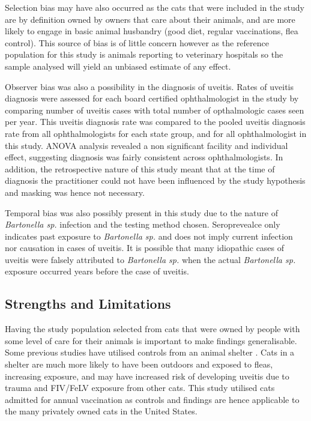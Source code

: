 \documentclass[11pt,twocolumn]{article}
\begin{document}
		Selection bias may have also occurred as the cats that were included in the study are by definition owned by owners that care about their animals, and are more likely to engage in basic animal husbandry (good diet, regular vaccinations, flea control).
		This source of bias is of little concern however as the reference population for this study is animals reporting to veterinary hospitals so the sample analysed will yield an unbiased estimate of any effect.


		Observer bias was also a possibility in the diagnosis of uveitis.
		Rates of uveitis diagnosis were assessed for each board certified ophthalmologist in the study by comparing number of uveitis cases with total number of opthalmologic cases seen per year. This uveitis diagnosis rate was compared to the pooled uveitis diagnosis rate from all ophthalmologists for each state group, and for all ophthalmologist in this study.
		ANOVA analysis revealed a non significant facility and individual effect, suggesting diagnosis was fairly consistent across ophthalmologists.
		In addition, the retrospective nature of this study meant that at the time of diagnosis the practitioner could not have been influenced by the study hypothesis and masking was hence not necessary. 


		Temporal bias was also possibly present in this study due to the nature of \emph{Bartonella sp.} infection and the testing method chosen. 
		Seroprevealce only indicates past exposure to \emph{Bartonella sp.} and does not imply current infection nor causation in cases of uveitis.
		It is possible that many idiopathic cases of uveitis were falsely attributed to \emph{Bartonella sp.} when the actual \emph{Bartonella sp.} exposure occurred years before the case of uveitis.


	\subsection{Strengths and Limitations}
		Having the study population selected from  cats that were owned by people with some level of care for their animals is important to make findings generalisable.
		Some previous studies have utilised controls from an animal shelter \cite{Lappin2000,Powell2010}. Cats in a shelter are much more likely to have been outdoors and exposed to fleas, increasing exposure, and may have increased risk of developing uveitis due to trauma and FIV/FeLV exposure from other cats\cite{Hill2000}.
		This study utilised cats admitted for annual vaccination as controls and findings are hence applicable to the many privately owned cats in the United States.
\end{document}
